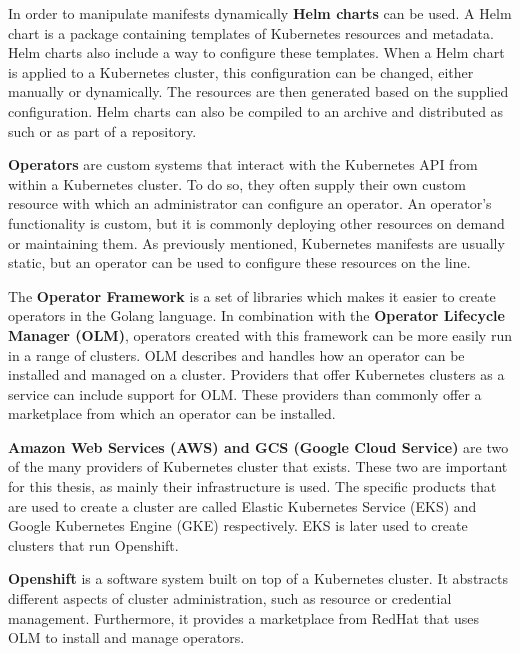 In order to manipulate manifests dynamically \textbf{Helm charts}\cite{helm-charts} can be used.
A Helm chart is a package containing templates of Kubernetes resources and metadata.
Helm charts also include a way to configure these templates.
When a Helm chart is applied to a Kubernetes cluster, this configuration can be changed, either manually or dynamically.
The resources are then generated based on the supplied configuration.
Helm charts can also be compiled to an archive and distributed as such or as part of a repository.

\textbf{Operators}\cite{kubernetes-operator} are custom systems that interact with the Kubernetes API from within a Kubernetes cluster.
To do so, they often supply their own custom resource with which an administrator can configure an operator.
An operator's functionality is custom, but it is commonly deploying other resources on demand or maintaining them.
As previously mentioned, Kubernetes manifests are usually static, but an operator can be used to configure these resources on the line.

The \textbf{Operator Framework}\cite{operator-framework, operator-lifecycle-manager} is a set of libraries which makes it easier to create operators in the Golang language.
In combination with the \textbf{Operator Lifecycle Manager (OLM)}\cite{operator-lifecycle-manager}, operators created with this framework can be more easily run in a range of clusters.
OLM describes and handles how an operator can be installed and managed on a cluster.
Providers that offer Kubernetes clusters as a service can include support for OLM.
These providers than commonly offer a marketplace from which an operator can be installed.

\textbf{Amazon Web Services (AWS) and GCS (Google Cloud Service)}\cite{eks,gke} are two of the many providers of Kubernetes cluster that exists.
These two are important for this thesis, as mainly their infrastructure is used.
The specific products that are used to create a cluster are called Elastic Kubernetes Service (EKS) and Google Kubernetes Engine (GKE) respectively.
EKS is later used to create clusters that run Openshift.

\textbf{Openshift}\cite{openshift} is a software system built on top of a Kubernetes cluster.
It abstracts different aspects of cluster administration, such as resource or credential management.
Furthermore, it provides a marketplace from RedHat that uses OLM to install and manage operators.


